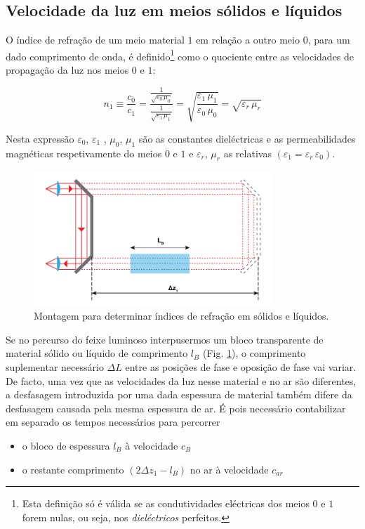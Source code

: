 \documentclass[a4paper,twoside,11pt]{report}      %
\begin{document}
\subsection{\sf Velocidade da luz em meios sólidos e líquidos}
 O índice de refração de um meio material $1$ em relação a outro meio $0$, para um dado comprimento de onda, é definido\footnote{Esta definição só é válida se as condutividades eléctricas dos meios $0$ e $1$ forem nulas, ou seja, nos \emph{dieléctricos} perfeitos.}
 como o quociente entre as velocidades de propagação da luz nos meios $0$ e $1$:

 \begin{equation}
	\label{eq:index}
	n_1 \equiv \frac{c_0}{c_1}  = \frac{\frac{1}{\sqrt{\varepsilon_0 \, \mu_0}} }{\frac{1}{\sqrt{\varepsilon_1 \, \mu_1}} } =
		\sqrt{\frac{\varepsilon_1 \, \mu_1}{\varepsilon_0 \, \mu_0}} = \sqrt{\varepsilon_r \, \mu_r}
\end{equation}

Nesta expressão $\varepsilon_0$, $\varepsilon_1$ ,	 $\mu_0$, $\mu_1$ são as constantes dieléctricas e as permeabilidades magnéticas respetivamente do meios $0$ e $1$ e $\varepsilon_r$, $\mu_r$    as relativas $(\varepsilon_1= \varepsilon_r\, \varepsilon_0)$.

\begin{figure}[h!tb]  
	\centering 
	\includegraphics[width=0.8\textwidth]{esquema2}
	\caption{Montagem para determinar índices de refração em sólidos e líquidos. \label{fig:Montagem_bloco}} 
\end{figure}

Se no percurso do feixe luminoso interpusermos um bloco transparente de material sólido ou líquido de comprimento $l_B$ (Fig. \ref{fig:Montagem_bloco}), o comprimento suplementar necessário $\Delta L$ entre as posições de fase e oposição de fase vai variar. De facto, uma vez que as velocidades da luz nesse material e no ar são diferentes, a desfasagem introduzida por uma dada espessura de material também difere da desfasagem causada pela mesma espessura de ar. É pois necessário contabilizar em separado os tempos necessários para percorrer 
\begin{itemize}
\item o bloco de espessura $l_B$ à velocidade $c_B$
\item o restante comprimento $(2\Delta z_1-l_B)$ no ar à velocidade $c_{ar}$
\end{itemize}
\end{document}
